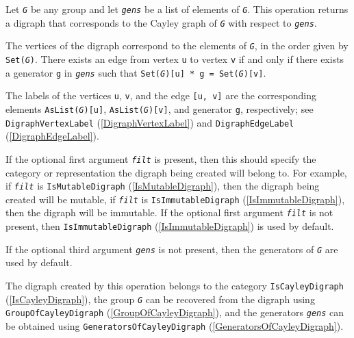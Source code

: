 \documentclass[a4paper,11pt]{report}
\begin{document}
{{{ Let \mbox{\texttt{\mdseries\slshape G}} be any group and let \mbox{\texttt{\mdseries\slshape gens}} be a list of elements of \mbox{\texttt{\mdseries\slshape G}}. This operation returns a digraph that corresponds to the Cayley graph of \mbox{\texttt{\mdseries\slshape G}} with respect to \mbox{\texttt{\mdseries\slshape gens}}. 

 The vertices of the digraph correspond to the elements of \mbox{\texttt{\mdseries\slshape G}}, in the order given by \texttt{Set(\mbox{\texttt{\mdseries\slshape G}})}. There exists an edge from vertex \texttt{u} to vertex \texttt{v} if and only if there exists a generator \texttt{g} in \mbox{\texttt{\mdseries\slshape gens}} such that \texttt{Set(\mbox{\texttt{\mdseries\slshape G}})[u] * g = Set(\mbox{\texttt{\mdseries\slshape G}})[v]}. 

 The labels of the vertices \texttt{u}, \texttt{v}, and the edge \texttt{[u, v]} are the corresponding elements \texttt{AsList(\mbox{\texttt{\mdseries\slshape G}})[u]}, \texttt{AsList(\mbox{\texttt{\mdseries\slshape G}})[v]}, and generator \texttt{g}, respectively; see \texttt{DigraphVertexLabel} (\ref{DigraphVertexLabel}) and \texttt{DigraphEdgeLabel} (\ref{DigraphEdgeLabel}). 

 If the optional first argument \mbox{\texttt{\mdseries\slshape filt}} is present, then this should specify the category or representation the
digraph being created will belong to. For example, if \mbox{\texttt{\mdseries\slshape filt}} is \texttt{IsMutableDigraph} (\ref{IsMutableDigraph}), then the digraph being created will be mutable, if \mbox{\texttt{\mdseries\slshape filt}} is \texttt{IsImmutableDigraph} (\ref{IsImmutableDigraph}), then the digraph will be immutable. If the optional first argument \mbox{\texttt{\mdseries\slshape filt}} is not present, then \texttt{IsImmutableDigraph} (\ref{IsImmutableDigraph}) is used by default.

 If the optional third argument \mbox{\texttt{\mdseries\slshape gens}} is not present, then the generators of \mbox{\texttt{\mdseries\slshape G}} are used by default.

 The digraph created by this operation belongs to the category \texttt{IsCayleyDigraph} (\ref{IsCayleyDigraph}), the group \mbox{\texttt{\mdseries\slshape G}} can be recovered from the digraph using \texttt{GroupOfCayleyDigraph} (\ref{GroupOfCayleyDigraph}), and the generators \mbox{\texttt{\mdseries\slshape gens}} can be obtained using \texttt{GeneratorsOfCayleyDigraph} (\ref{GeneratorsOfCayleyDigraph}).

}}}
\end{document}
